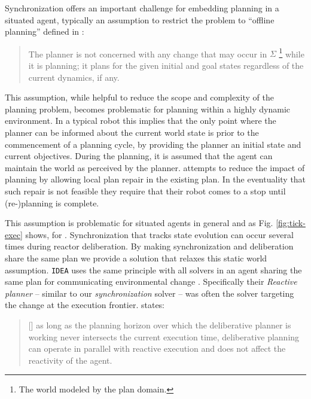Synchronization offers an important challenge for embedding planning
in a situated agent, typically an assumption to restrict the problem
to ``offline planning'' defined in \cite{ghallab04}:

{\scriptsize
  \begin{quote}
    The planner is not concerned with any change that may occur in
    $\Sigma$ \footnote{The world modeled by the plan domain.} while it
    is planning; it plans for the given initial and goal states
    regardless of the current dynamics, if any.
\end{quote}}

This assumption, while helpful to reduce the scope and complexity of
the planning problem, becomes problematic for planning within a highly
dynamic environment. In a typical robot this implies that the only
point where the planner can be informed about the current world state
is prior to the commencement of a planning cycle, by providing the
planner an initial state and current objectives. During the planning,
it is assumed that the agent can maintain the world as perceived by
the planner. \cite{lemai04, lemai-chenevier2004} attempts to reduce
the impact of planning by allowing local plan repair in the existing
plan. In the eventuality that such repair is not feasible they require
that their robot comes to a stop until (re-)planning is complete.  

This assumption is problematic for situated agents in general and as
Fig. \ref{fig:tick-exec} shows, for \rx. Synchronization that tracks
state evolution can occur several times during reactor
deliberation. By making synchronization and deliberation share the
same plan we provide a solution that relaxes this static world
assumption. \texttt{IDEA} uses the same principle with all solvers in
an agent sharing the same plan for communicating environmental change
\cite{Dias:2003ua, mus06}. Specifically their {\em Reactive planner}
-- similar to our {\em synchronization} solver -- was often the solver
targeting the change at the execution frontier. 
\cite{Dias:2003ua} states:

{\scriptsize
  \begin{quote}
  [\textellipsis] as long as the planning horizon over which the
  deliberative planner is working never intersects the current
  execution time, deliberative planning can operate in parallel with
  reactive execution and does not affect the reactivity of the agent. 
\end{quote}}

